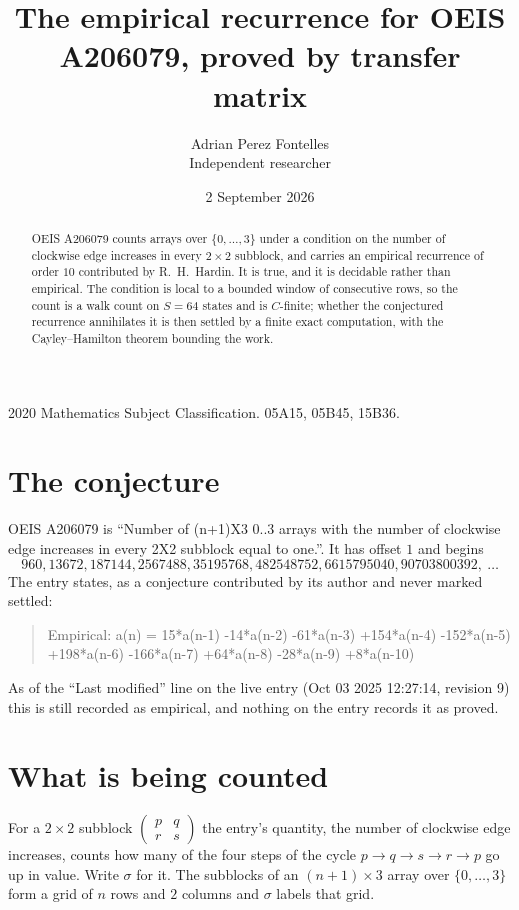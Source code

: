 \documentclass[11pt,a4paper]{article}
\title{The empirical recurrence for OEIS A206079, proved by transfer matrix}
\author{Adrian Perez Fontelles\\ \small Independent researcher}
\date{2 September 2026}
\theoremstyle{plain}
\theoremstyle{definition}
\begin{document}
\maketitle

\begin{abstract}
OEIS A206079 counts arrays over $\{0,\dots,3\}$ under a condition on the number of clockwise edge increases
in every $2\times2$ subblock, and carries an empirical recurrence of order $10$ contributed by
R.~H.~Hardin. It is true, and it is decidable rather than empirical. The condition is local to
a bounded window of consecutive rows, so the count is a walk count on $S=64$ states and is
$C$-finite; whether the conjectured recurrence annihilates it is then settled by a finite exact
computation, with the Cayley--Hamilton theorem bounding the work.
\end{abstract}

\noindent\small 2020 Mathematics Subject Classification. 05A15, 05B45, 15B36.\normalsize

\section{The conjecture}

OEIS A206079 is ``Number of (n+1)X3 0..3 arrays with the number of clockwise edge increases in every 2X2 subblock equal to one.''. It has offset $1$ and begins
\[
960, 13672, 187144, 2567488, 35195768, 482548752, 6615795040, 90703800392,\ \dots
\]
The entry states, as a conjecture contributed by its author and never marked settled:
\begin{quote}
Empirical: a(n) = 15*a(n-1) -14*a(n-2) -61*a(n-3) +154*a(n-4) -152*a(n-5) +198*a(n-6) -166*a(n-7) +64*a(n-8) -28*a(n-9) +8*a(n-10)
\end{quote}
As of the ``Last modified'' line on the live entry (Oct 03 2025 12:27:14, revision 9) this is still
recorded as empirical, and nothing on the entry records it as proved.

\section{What is being counted}

For a $2\times2$ subblock $\begin{pmatrix}p&q\\r&s\end{pmatrix}$ the
entry's quantity, the number of clockwise edge increases, counts how many of the four steps of the cycle $p\to q\to s\to r\to p$ go up in value. Write $\sigma$ for it. The subblocks of an
$(n+1)\times3$ array over $\{0,\dots,3\}$ form a grid of $n$ rows and $2$
columns and $\sigma$ labels that grid.
\end{document}
